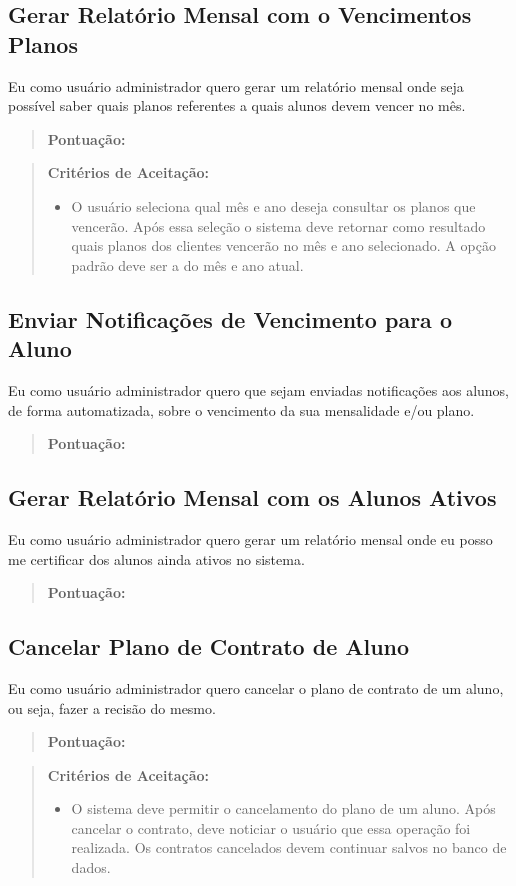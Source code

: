 \subsection[Gerar Relatório Mensal com o Vencimentos Planos]{Gerar Relatório Mensal com o Vencimentos Planos}
Eu como usuário administrador quero gerar um relatório mensal onde seja possível
saber quais planos referentes a quais alunos devem vencer no mês.
\begin{quote}
    \textbf{Pontuação:}
\end{quote}
\begin{quote}
\textbf{Critérios de Aceitação:}
    \begin{itemize}
        \item O usuário seleciona qual mês e ano deseja consultar os planos que vencerão. Após essa seleção o sistema deve retornar como resultado quais planos dos clientes vencerão no mês e ano selecionado. A opção padrão deve ser a do mês e ano atual.
    \end{itemize}
\end{quote}

\subsection[Enviar Notificações de Vencimento para o Aluno]{Enviar Notificações de Vencimento para o Aluno}
Eu como usuário administrador quero que sejam enviadas notificações aos alunos,
de forma automatizada, sobre o vencimento da sua mensalidade e/ou plano.
\begin{quote}
    \textbf{Pontuação:}
\end{quote}

\subsection[Gerar Relatório Mensal com os Alunos Ativos]{Gerar Relatório Mensal com os Alunos Ativos}
Eu como usuário administrador quero gerar um relatório mensal onde eu posso me
certificar dos alunos ainda ativos no sistema.
\begin{quote}
    \textbf{Pontuação:}
\end{quote}

\subsection[Cancelar Plano de Contrato de Aluno]{Cancelar Plano de Contrato de Aluno}
Eu como usuário administrador quero cancelar o plano de contrato de um aluno,
ou seja, fazer a recisão do mesmo.
\begin{quote}
    \textbf{Pontuação:}
\end{quote}
\begin{quote}
\textbf{Critérios de Aceitação:}
    \begin{itemize}
        \item O sistema deve permitir o cancelamento do plano de um aluno. Após cancelar o contrato, deve noticiar o usuário que essa operação foi realizada. Os contratos cancelados devem continuar salvos no banco de dados.
    \end{itemize}
\end{quote}

